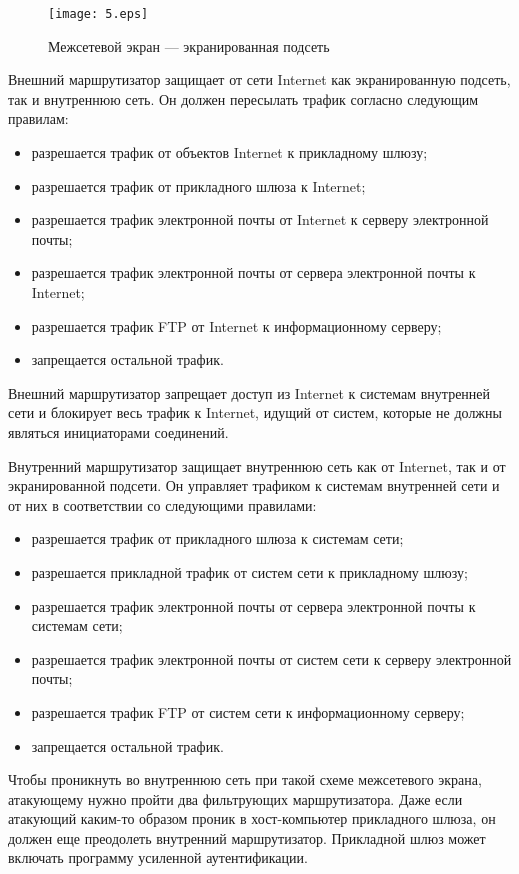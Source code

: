 \begin{figure}[!htp]
\centerline{\texttt{[image: 5.eps]}}
\label{fig:gor:5}
\caption{Межсетевой экран --- экранированная подсеть}
\end{figure}
Внешний маршрутизатор защищает от сети Internet как экранированную
подсеть, так и внутреннюю сеть. Он должен пересылать трафик согласно
следующим правилам:
\begin{itemize}
\item   разрешается трафик от объектов Internet к прикладному шлюзу;
\item   разрешается трафик от прикладного шлюза к Internet;
\item   разрешается трафик электронной почты от Internet к серверу электронной почты;
\item   разрешается трафик электронной почты от сервера электронной почты к Internet;
\item   разрешается трафик FTP от Internet к информационному серверу;
\item   запрещается остальной трафик.
\end{itemize}
Внешний маршрутизатор запрещает доступ из Internet к системам
внутренней сети и блокирует весь трафик к Internet, идущий от систем,
которые не должны являться инициаторами соединений.

Внутренний маршрутизатор защищает внутреннюю сеть как от Internet, так
и от экранированной подсети. Он управляет трафиком к системам
внутренней сети и от них в соответствии со следующими правилами:
\begin{itemize}
\item  разрешается трафик от прикладного шлюза к системам сети;
\item  разрешается прикладной трафик от систем сети к прикладному шлюзу;
\item  разрешается трафик электронной почты от сервера электронной почты к системам сети;
\item   разрешается трафик электронной почты от систем сети к серверу электронной почты;
\item   разрешается трафик FTP от систем сети к информационному серверу;
\item   запрещается остальной трафик.
\end{itemize}
Чтобы проникнуть во внутреннюю сеть при такой схеме межсетевого
экрана, атакующему нужно пройти два фильтрующих маршрутизатора. Даже
если атакующий каким-то образом проник в хост-компьютер прикладного
шлюза, он должен еще преодолеть внутренний маршрутизатор. Прикладной
шлюз может включать программу усиленной аутентификации.

